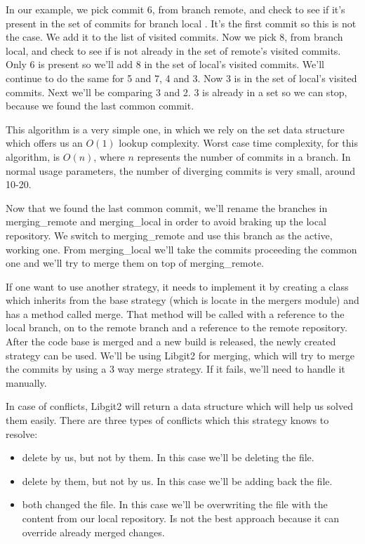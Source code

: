 In our example, we pick commit 6, from branch remote, and check to see if it's present in the set of commits for branch local . It's the first commit so this is not the case. We add it to the list of visited commits. Now we pick 8, from branch local, and check to see if is not already in the set of remote's  visited commits.
Only 6 is present so we'll add 8 in the set of local's visited commits. We'll continue to do the same for 5 and 7, 4 and 3. Now 3 is in the set of local's visited commits. Next we'll be comparing 3 and 2. 3 is already in a set so we can stop, because we found the last common commit.

This algorithm is a very simple one, in which we rely on the set data structure which offers us an $O(1)$ lookup complexity. Worst case time complexity, for this algorithm, is $O(n)$, where $n$ represents the number of commits in a branch. In normal usage parameters, the number of diverging commits is very small, around 10-20.

Now that we found the last common commit, we'll rename the branches in merging\_remote and merging\_local in order to avoid braking up the local repository. We switch to merging\_remote and use this branch as the active, working one. From merging\_local we'll take the commits proceeding the common one and we'll try to merge them on top of merging\_remote. 

If one want to use another strategy, it needs to implement it by creating a class which inherits from the base strategy (which is locate in the mergers module) and has a method called merge. That method will be called with a reference to the local branch, on to the remote branch and a reference to the remote repository. After the code base is merged and a new build is released, the newly created strategy can be used. We'll be using Libgit2 for merging, which will try to merge the commits by using a 3 way merge strategy. If it fails, we'll need to handle it manually.

In case of conflicts, Libgit2 will return a data structure which will help us solved them easily. There are three types of conflicts which this strategy knows to resolve:
\begin{itemize}
    \item delete by us, but not by them. In this case we'll be deleting the file.
    \item delete by them, but not by us. In this case we'll be adding back the file.
    \item both changed the file. In this case we'll be overwriting the file with the content from our local repository. Is not the best approach because it can override already merged changes.
\end{itemize}

